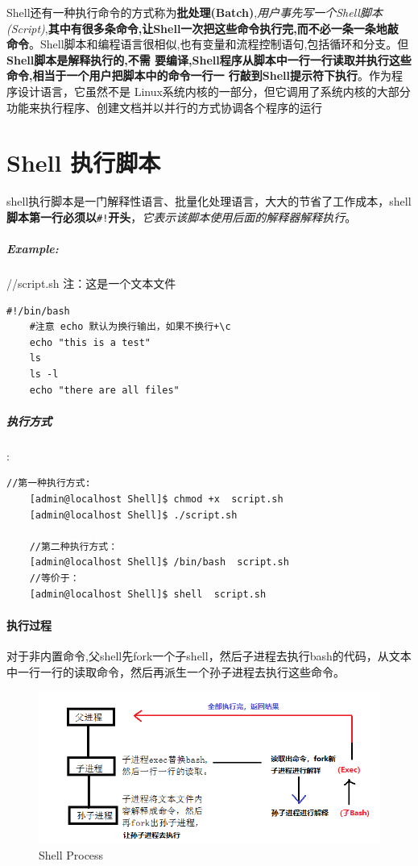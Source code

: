 \documentclass[UTF8,a4paper,12pt]{ctexbook}
\begin{document}
			 Shell还有一种执行命令的方式称为\textbf{批处理(Batch)},\textit{用户事先写一个Shell脚本(Script)},\textbf{其中有很多条命令,让Shell一次把这些命令执行完,而不必一条一条地敲 命令}。Shell脚本和编程语言很相似,也有变量和流程控制语句,包括循环和分支。但\textbf{Shell脚本是解释执行的,不需 要编译,Shell程序从脚本中一行一行读取并执行这些命令,相当于一个用户把脚本中的命令一行一 行敲到Shell提示符下执行}。作为程序设计语言，它虽然不是 Linux系统内核的一部分，但它调用了系统内核的大部分功能来执行程序、创建文档并以并行的方式协调各个程序的运行
		 \section{Shell 执行脚本}
			 shell执行脚本是一门解释性语言、批量化处理语言，大大的节省了工作成本，shell\textbf{脚本第一行必须以}\verb|#!|\textbf{开头}，\textit{它表示该脚本使用后面的解释器解释执行}。
			 
			\subparagraph{Example:}
			 //script.sh   注：这是一个文本文件
			 \begin{lstlisting}[frame=L,xleftmargin=.06\textwidth]
	#!/bin/bash
	#注意 echo 默认为换行输出，如果不换行+\c 
	echo "this is a test"	
	ls
	ls -l
	echo "there are all files"
			 \end{lstlisting}
			 
			 \subparagraph{执行方式}:
				 \begin{lstlisting}[frame=L,xleftmargin=.06\textwidth]
	//第一种执行方式:
	[admin@localhost Shell]$ chmod +x  script.sh
	[admin@localhost Shell]$ ./script.sh
	
	//第二种执行方式：
	[admin@localhost Shell]$ /bin/bash  script.sh
	//等价于：
	[admin@localhost Shell]$ shell  script.sh
				 \end{lstlisting}
		 
			 \paragraph{执行过程}
			 	对于非内置命令,父shell先fork一个子shell，然后子进程去执行bash的代码，从文本中一行一行的读取命令，然后再派生一个孙子进程去执行这些命令。
			 	
			 	\begin{figure}[H]
			 		\centering
			 		\includegraphics[scale=0.7]{shellProcess}
			 		\caption{Shell Process}
			 	\end{figure}
				 
\end{document}
